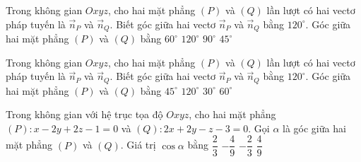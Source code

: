 \begin{ex}%
	Trong không gian  $Oxyz$, cho hai mặt phẳng $(P)$ và $(Q)$ lần lượt có hai vectơ pháp tuyến là $\overrightarrow{n}_P$ và $\overrightarrow{n}_Q$. Biết góc giữa hai vectơ $\overrightarrow{n}_P$ và $\overrightarrow{n}_Q$ bằng $120^\circ$. Góc giữa hai mặt phẳng $(P)$ và $(Q)$ bằng
	 \choice
		{\True  $60^\circ$}
		 {$120^\circ$}
		{$90^\circ$} 
		{$45^\circ$} 
\end{ex}

\begin{ex}%
	Trong không gian $Oxyz$, cho hai mặt phẳng $(P)$ và $(Q)$ lần lượt  có hai vectơ pháp tuyến là $\overrightarrow{n}_P$ và $\overrightarrow{n}_Q$. Biết góc giữa hai vectơ $\overrightarrow{n}_P$ và $\overrightarrow{n}_Q$ bằng $120^\circ$. Góc giữa hai mặt phẳng $(P)$ và $(Q)$ bằng
	\choice 
		 {$45^\circ$}
		 {$120^\circ$}
		 {$30^\circ$}
		 {\True $60^\circ$}
\end{ex}

\begin{ex}%
	Trong không gian với hệ trục tọa độ $Oxyz$, cho hai mặt phẳng $(P)\colon x-2y+2z-1=0$  và $(Q)\colon 2x+2y-z-3=0$. Gọi $\alpha$ là góc giữa hai mặt phẳng $(P)$ và $(Q)$. Giá trị $\cos \alpha$ bằng
	\choice 
		 {$\dfrac{2}{3}$}
		{$-\dfrac{4}{9}$} 
		{$-\dfrac{2}{3}$} 
		{\True  $\dfrac{4}{9}$}
\end{ex}

